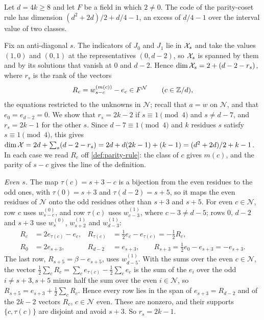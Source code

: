 \begin{theorem}\label{thm:parity-all}
\notformalized
Let $d=4k\ge8$ and let $F$ be a field in which $2\ne0$. The code of the parity-coset rule has dimension
$(d^2+2d)/2+d/4-1$, an excess of $d/4-1$ over the interval value of two classes.
\end{theorem}

\begin{informalproof}
Fix an anti-diagonal $s$. The indicators of $J_0$ and $J_1$ lie in $\mathcal{X}_s$ and take the values $(1,0)$ and $(0,1)$ at the
representatives $(0,d-2)$, so $\mathcal{X}_s$ is spanned by them and by its solutions that vanish at $0$ and $d-2$. Hence
$\dim\mathcal{X}_s=2+(d-2-r_s)$, where $r_s$ is the rank of the vectors
\[
  R_c=w^{(m(c))}_{s-c}-e_c\in F^{\mathcal N}\qquad(c\in\mathbb{Z}/d),
\]
the equations restricted to the unknowns in $\mathcal N$; recall that $a=w$ on $\mathcal N$, and that $e_0=e_{d-2}=0$.
We show that $r_s=2k-2$ if $s\equiv1\pmod4$ and $s\ne d-7$, and $r_s=2k-1$ for the other $s$. Since $d-7\equiv1\pmod4$
and $k$ residues $s$ satisfy $s\equiv1\pmod4$, this gives
$\dim\mathcal{X}=2d+\sum_s(d-2-r_s)=2d+d(2k-1)+(k-1)=(d^2+2d)/2+k-1$. In each case we read $R_c$ off
\cref{def:parity-rule}: the class of $c$ gives $m(c)$, and the parity of $s-c$ gives the line of the definition.

\emph{Even $s$.} The map $\tau(c)=s+3-c$ is a bijection from the even residues to the odd ones, with $\tau(0)=s+3$ and
$\tau(d-2)=s+5$, so it maps the even residues of $\mathcal N$ onto the odd residues other than $s+3$ and $s+5$. For
even $c\in\mathcal N$, row $c$ uses $w^{(0)}_{s-c}$, and row $\tau(c)$ uses $w^{(1)}_{c-3}$, where $c-3\ne d-5$; rows
$0$, $d-2$ and $s+3$ use $w^{(0)}_s$, $w^{(1)}_{s+2}$ and $w^{(1)}_{d-3}$:
\begin{align*}
  R_c&=2e_{\tau(c)}-e_c, & R_{\tau(c)}&=\tfrac12e_c-e_{\tau(c)}=-\tfrac12R_c,\\
  R_0&=2e_{s+3}, & R_{d-2}&=e_{s+3},\qquad R_{s+3}=\tfrac12e_0-e_{s+3}=-e_{s+3}.
\end{align*}
The last row, $R_{s+5}=\beta-e_{s+5}$, uses $w^{(1)}_{d-5}$. With the sums over the even $c\in\mathcal N$, the vector
$\frac12\sum_cR_c=\sum_ce_{\tau(c)}-\frac12\sum_ce_c$ is the sum of the $e_i$ over the odd $i\ne s+3,s+5$ minus half the
sum over the even $i\in\mathcal N$, so $R_{s+5}=e_{s+3}+\frac12\sum_cR_c$. Hence every row lies in the span of
$e_{s+3}=R_{d-2}$ and of the $2k-2$ vectors $R_c$, $c\in\mathcal N$ even. These are nonzero, and their supports
$\{c,\tau(c)\}$ are disjoint and avoid $s+3$. So $r_s=2k-1$.


\end{informalproof}
